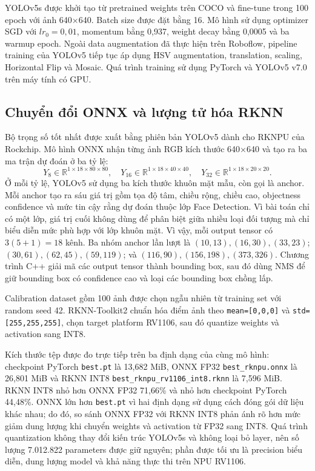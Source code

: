 \documentclass[11pt,a4paper]{article}
\begin{document}
YOLOv5s được khởi tạo từ pretrained weights trên COCO và fine-tune trong 100 epoch với ảnh 640$\times$640. Batch size được đặt bằng 16. Mô hình sử dụng optimizer SGD với $lr_0=0{,}01$, momentum bằng 0,937, weight decay bằng 0,0005 và ba warmup epoch. Ngoài data augmentation đã thực hiện trên Roboflow, pipeline training của YOLOv5 tiếp tục áp dụng HSV augmentation, translation, scaling, Horizontal Flip và Mosaic. Quá trình training sử dụng PyTorch và YOLOv5 v7.0 trên máy tính có GPU.

\subsection{Chuyển đổi ONNX và lượng tử hóa RKNN}

Bộ trọng số tốt nhất được xuất bằng phiên bản YOLOv5 dành cho RKNPU của Rockchip. Mô hình ONNX nhận từng ảnh RGB kích thước 640$\times$640 và tạo ra ba ma trận dự đoán ở ba tỷ lệ:
\begin{equation}
Y_8\in\mathbb{R}^{1\times18\times80\times80},\quad
Y_{16}\in\mathbb{R}^{1\times18\times40\times40},\quad
Y_{32}\in\mathbb{R}^{1\times18\times20\times20}.
\end{equation}
Ở mỗi tỷ lệ, YOLOv5 sử dụng ba kích thước khuôn mặt mẫu, còn gọi là anchor. Mỗi anchor tạo ra sáu giá trị gồm tọa độ tâm, chiều rộng, chiều cao, objectness confidence và mức tin cậy rằng dự đoán thuộc lớp Face Detection. Vì bài toán chỉ có một lớp, giá trị cuối không dùng để phân biệt giữa nhiều loại đối tượng mà chỉ biểu diễn mức phù hợp với lớp khuôn mặt. Vì vậy, mỗi output tensor có $3(5+1)=18$ kênh. Ba nhóm anchor lần lượt là \((10,13),(16,30),(33,23)\); \((30,61),(62,45),(59,119)\); và \((116,90),(156,198),(373,326)\). Chương trình C++ giải mã các output tensor thành bounding box, sau đó dùng NMS để giữ bounding box có confidence cao và loại các bounding box chồng lấp.

Calibration dataset gồm 100 ảnh được chọn ngẫu nhiên từ training set với random seed 42. RKNN-Toolkit2 chuẩn hóa điểm ảnh theo \texttt{mean=[0,0,0]} và \texttt{std=[255,255,255]}, chọn target platform RV1106, sau đó quantize weights và activation sang INT8.

Kích thước tệp được đo trực tiếp trên ba định dạng của cùng mô hình: checkpoint PyTorch \texttt{best.pt} là 13,682 MiB, ONNX FP32 \texttt{best\_rknpu.onnx} là 26,801 MiB và RKNN INT8 \texttt{best\_rknpu\_rv1106\_int8.rknn} là 7,596 MiB. RKNN INT8 nhỏ hơn ONNX FP32 71,66\% và nhỏ hơn checkpoint PyTorch 44,48\%. ONNX lớn hơn \texttt{best.pt} vì hai định dạng sử dụng cách đóng gói dữ liệu khác nhau; do đó, so sánh ONNX FP32 với RKNN INT8 phản ánh rõ hơn mức giảm dung lượng khi chuyển weights và activation từ FP32 sang INT8. Quá trình quantization không thay đổi kiến trúc YOLOv5s và không loại bỏ layer, nên số lượng 7.012.822 parameters được giữ nguyên; phần được tối ưu là precision biểu diễn, dung lượng model và khả năng thực thi trên NPU RV1106.
\end{document}
